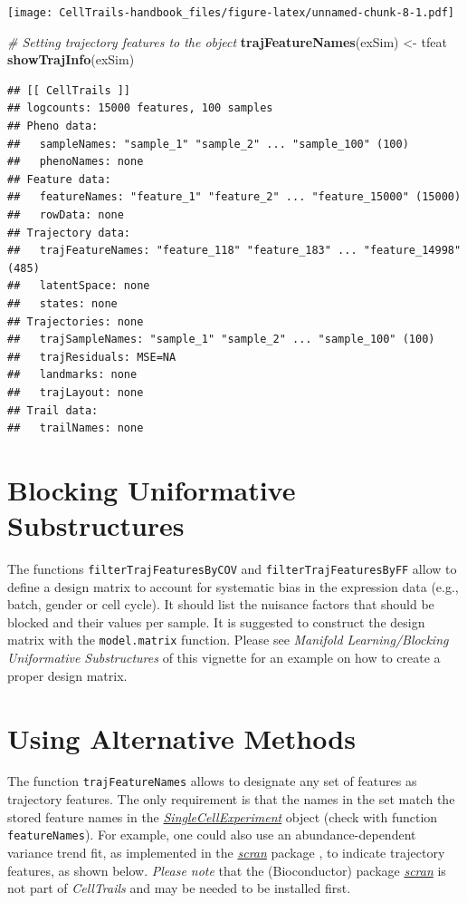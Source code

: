 \documentclass[]{book}
\newenvironment{Shaded}{\begin{snugshade}}{\end{snugshade}}
\newcommand{\KeywordTok}[1]{\textcolor[rgb]{0.13,0.29,0.53}{\textbf{#1}}}
\newcommand{\StringTok}[1]{\textcolor[rgb]{0.31,0.60,0.02}{#1}}
\newcommand{\CommentTok}[1]{\textcolor[rgb]{0.56,0.35,0.01}{\textit{#1}}}
\newcommand{\NormalTok}[1]{#1}
\theoremstyle{definition}
\theoremstyle{definition}
\theoremstyle{definition}
\theoremstyle{remark}
\begin{document}
\texttt{[image: CellTrails-handbook\_files/figure-latex/unnamed-chunk-8-1.pdf]}

\begin{Shaded}
\begin{Highlighting}[]
\CommentTok{# Setting trajectory features to the object}
\KeywordTok{trajFeatureNames}\NormalTok{(exSim) <-}\StringTok{ }\NormalTok{tfeat}
\KeywordTok{showTrajInfo}\NormalTok{(exSim)}
\end{Highlighting}
\end{Shaded}

\begin{verbatim}
## [[ CellTrails ]] 
## logcounts: 15000 features, 100 samples
## Pheno data: 
##   sampleNames: "sample_1" "sample_2" ... "sample_100" (100)
##   phenoNames: none
## Feature data: 
##   featureNames: "feature_1" "feature_2" ... "feature_15000" (15000)
##   rowData: none
## Trajectory data: 
##   trajFeatureNames: "feature_118" "feature_183" ... "feature_14998" (485)
##   latentSpace: none
##   states: none
## Trajectories: none
##   trajSampleNames: "sample_1" "sample_2" ... "sample_100" (100)
##   trajResiduals: MSE=NA
##   landmarks: none
##   trajLayout: none
## Trail data: 
##   trailNames: none
\end{verbatim}

\section{Blocking Uniformative
Substructures}\label{blocking-uniformative-substructures}

The functions \texttt{filterTrajFeaturesByCOV} and
\texttt{filterTrajFeaturesByFF} allow to define a design matrix to
account for systematic bias in the expression data (e.g., batch, gender
or cell cycle). It should list the nuisance factors that should be
blocked and their values per sample. It is suggested to construct the
design matrix with the \texttt{model.matrix} function. Please see
\emph{Manifold Learning/Blocking Uniformative Substructures} of this
vignette for an example on how to create a proper design matrix.

\section{Using Alternative Methods}\label{using-alternative-methods}

The function \texttt{trajFeatureNames} allows to designate any set of
features as trajectory features. The only requirement is that the names
in the set match the stored feature names in the
\emph{\href{http://bioconductor.org/packages/SingleCellExperiment}{SingleCellExperiment}}
object (check with function \texttt{featureNames}). For example, one
could also use an abundance-dependent variance trend fit, as implemented
in the \emph{\href{http://bioconductor.org/packages/scran}{scran}}
package \citep{scran}, to indicate trajectory features, as shown below.
\emph{Please note} that the (Bioconductor) package
\emph{\href{http://bioconductor.org/packages/scran}{scran}} is not part
of \emph{CellTrails} and may be needed to be installed first.
\end{document}
